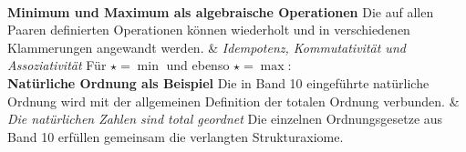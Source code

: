 \begin{BandUebersicht}
\\
\addlinespace[.8ex]
\textbf{Minimum und Maximum als algebraische Operationen}
Die auf allen Paaren definierten Operationen können wiederholt
und in verschiedenen Klammerungen angewandt werden.
&
\textit{Idempotenz, Kommutativität und Assoziativität}
Für \(\star=\min\) und ebenso \(\star=\max\):
\\
\addlinespace[.8ex]
\textbf{Natürliche Ordnung als Beispiel}
Die in Band 10 eingeführte natürliche Ordnung wird mit der
allgemeinen Definition der totalen Ordnung verbunden.
&
\textit{Die natürlichen Zahlen sind total geordnet}
Die einzelnen Ordnungsgesetze aus Band 10 erfüllen gemeinsam
die verlangten Strukturaxiome.
\\
\end{BandUebersicht}
